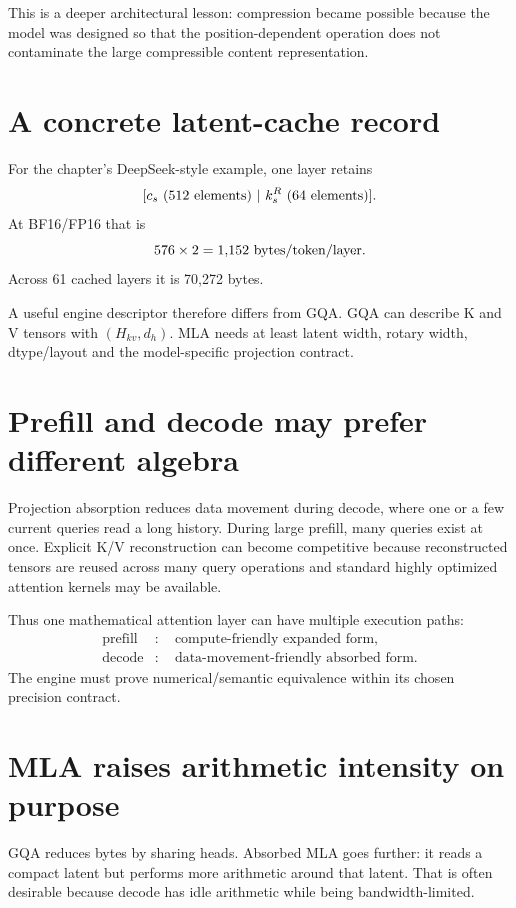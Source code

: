 This is a deeper architectural lesson: compression became possible because the model
was designed so that the position-dependent operation does not contaminate the large
compressible content representation.

\section{A concrete latent-cache record}

For the chapter's DeepSeek-style example, one layer retains
\[
[c_s\ (512\ {\rm elements})\ |\ k^R_s\ (64\ {\rm elements})].
\]
At BF16/FP16 that is
\[
576\times2=1{,}152\ {\rm bytes/token/layer}.
\]
Across 61 cached layers it is 70,272 bytes.

A useful engine descriptor therefore differs from GQA. GQA can describe K and V tensors
with $(H_{kv},d_h)$. MLA needs at least latent width, rotary width, dtype/layout and
the model-specific projection contract.

\section{Prefill and decode may prefer different algebra}

Projection absorption reduces data movement during decode, where one or a few current
queries read a long history. During large prefill, many queries exist at once. Explicit
K/V reconstruction can become competitive because reconstructed tensors are reused
across many query operations and standard highly optimized attention kernels may be
available.

Thus one mathematical attention layer can have multiple execution paths:
\begin{align*}
\text{prefill} &:\quad \text{compute-friendly expanded form},\\
\text{decode} &:\quad \text{data-movement-friendly absorbed form}.
\end{align*}
The engine must prove numerical/semantic equivalence within its chosen precision
contract.

\section{MLA raises arithmetic intensity on purpose}

GQA reduces bytes by sharing heads. Absorbed MLA goes further: it reads a compact latent
but performs more arithmetic around that latent. That is often desirable because
decode has idle arithmetic while being bandwidth-limited.

